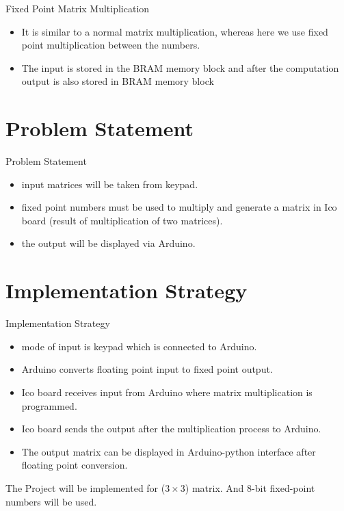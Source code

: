 \documentclass[10pt]{beamer}
\begin{document}
\begin{frame}[fragile]{Fixed Point Matrix Multiplication}
\begin{itemize}
    \item It is similar to a normal matrix multiplication, whereas here we use fixed point multiplication between the numbers.
    \item
    The input is stored in the BRAM memory block and after the computation output is also stored in BRAM memory block
\end{itemize}
    
\end{frame}


\section{Problem Statement}

\begin{frame}{Problem Statement}
	\begin{itemize}
		\item input matrices will be taken from keypad.
		\item fixed point numbers must be used to multiply and generate a matrix in Ico board (result of multiplication of two matrices).
		\item the output will be displayed via Arduino.
	\end{itemize}
	
\end{frame}

\section{Implementation Strategy}

\begin{frame}[fragile]{Implementation Strategy}
	\begin{itemize}
		\item mode of input is keypad which is connected to Arduino.
		\item Arduino converts floating point input to fixed point output. 
		\item Ico board receives input from Arduino where matrix multiplication is programmed.
		\item Ico board sends the output after the multiplication process to Arduino.
		\item The output matrix can be displayed in Arduino-python interface after floating point conversion.
	\end{itemize}
	The Project will be implemented for (\(3\times3\)) matrix. And 8-bit fixed-point numbers will be used.
\end{frame}
\end{document}
